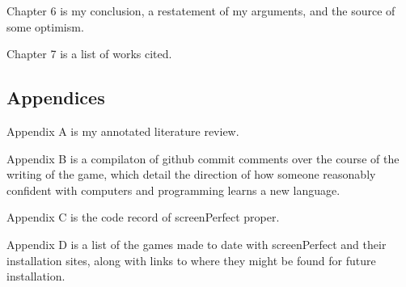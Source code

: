 Chapter 6 is my conclusion, a restatement of my arguments, and the source of some optimism.

Chapter 7 is a list of works cited.

\subsection{Appendices}
Appendix A is my annotated literature review.

Appendix B is a compilaton of github commit comments over the course of the writing of the game, which detail the direction of how someone reasonably confident with computers and programming learns a new language. 

Appendix C is the code record of screenPerfect proper.

Appendix D is a list of the games made to date with screenPerfect and their installation sites, along with links to where they might be found for future installation.
